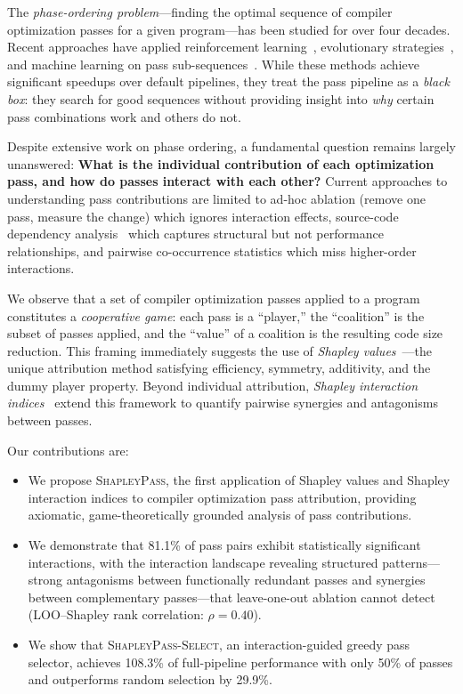 \documentclass{article}
\begin{document}
The \emph{phase-ordering problem}---finding the optimal sequence of compiler optimization passes for a given program---has been studied for over four decades. Recent approaches have applied reinforcement learning~\citep{deng2025compilerdream}, evolutionary strategies~\citep{brownlee2022optimizing}, and machine learning on pass sub-sequences~\citep{jantz2017micomp, mammadli2024efficient}. While these methods achieve significant speedups over default pipelines, they treat the pass pipeline as a \emph{black box}: they search for good sequences without providing insight into \emph{why} certain pass combinations work and others do not.

Despite extensive work on phase ordering, a fundamental question remains largely unanswered: \textbf{What is the individual contribution of each optimization pass, and how do passes interact with each other?} Current approaches to understanding pass contributions are limited to ad-hoc ablation (remove one pass, measure the change) which ignores interaction effects, source-code dependency analysis~\citep{mammadli2024efficient} which captures structural but not performance relationships, and pairwise co-occurrence statistics which miss higher-order interactions.

We observe that a set of compiler optimization passes applied to a program constitutes a \emph{cooperative game}: each pass is a ``player,'' the ``coalition'' is the subset of passes applied, and the ``value'' of a coalition is the resulting code size reduction. This framing immediately suggests the use of \emph{Shapley values}~\citep{shapley1953value}---the unique attribution method satisfying efficiency, symmetry, additivity, and the dummy player property. Beyond individual attribution, \emph{Shapley interaction indices}~\citep{grabisch1999axiomatic} extend this framework to quantify pairwise synergies and antagonisms between passes.

Our contributions are:
\begin{itemize}
    \item We propose \textsc{ShapleyPass}, the first application of Shapley values and Shapley interaction indices to compiler optimization pass attribution, providing axiomatic, game-theoretically grounded analysis of pass contributions.
    \item We demonstrate that 81.1\% of pass pairs exhibit statistically significant interactions, with the interaction landscape revealing structured patterns---strong antagonisms between functionally redundant passes and synergies between complementary passes---that leave-one-out ablation cannot detect (LOO--Shapley rank correlation: $\rho = 0.40$).
    \item We show that \textsc{ShapleyPass-Select}, an interaction-guided greedy pass selector, achieves 108.3\% of full-pipeline performance with only 50\% of passes and outperforms random selection by 29.9\%.
\end{itemize}
\end{document}
